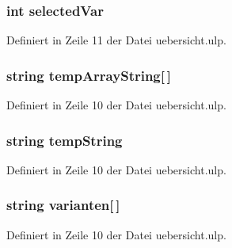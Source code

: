 \subsubsection[{selected\+Var}]{\setlength{\rightskip}{0pt plus 5cm}int selected\+Var}\label{uebersicht_8ulp_aa69b6cb226fe16181283ae71f98447ee}


Definiert in Zeile 11 der Datei uebersicht.\+ulp.

\hypertarget{uebersicht_8ulp_a66a5840a967c878c8e5e92faa50960b7}{}
\subsubsection[{temp\+Array\+String}]{\setlength{\rightskip}{0pt plus 5cm}string temp\+Array\+String\mbox{[}$\,$\mbox{]}}\label{uebersicht_8ulp_a66a5840a967c878c8e5e92faa50960b7}


Definiert in Zeile 10 der Datei uebersicht.\+ulp.

\hypertarget{uebersicht_8ulp_a06150de8aca4a33d4ff39693f2bf401d}{}
\subsubsection[{temp\+String}]{\setlength{\rightskip}{0pt plus 5cm}string temp\+String}\label{uebersicht_8ulp_a06150de8aca4a33d4ff39693f2bf401d}


Definiert in Zeile 10 der Datei uebersicht.\+ulp.

\hypertarget{uebersicht_8ulp_aa9e90938c87487c95afbb137be5ff83d}{}
\subsubsection[{varianten}]{\setlength{\rightskip}{0pt plus 5cm}string varianten\mbox{[}$\,$\mbox{]}}\label{uebersicht_8ulp_aa9e90938c87487c95afbb137be5ff83d}


Definiert in Zeile 10 der Datei uebersicht.\+ulp.

